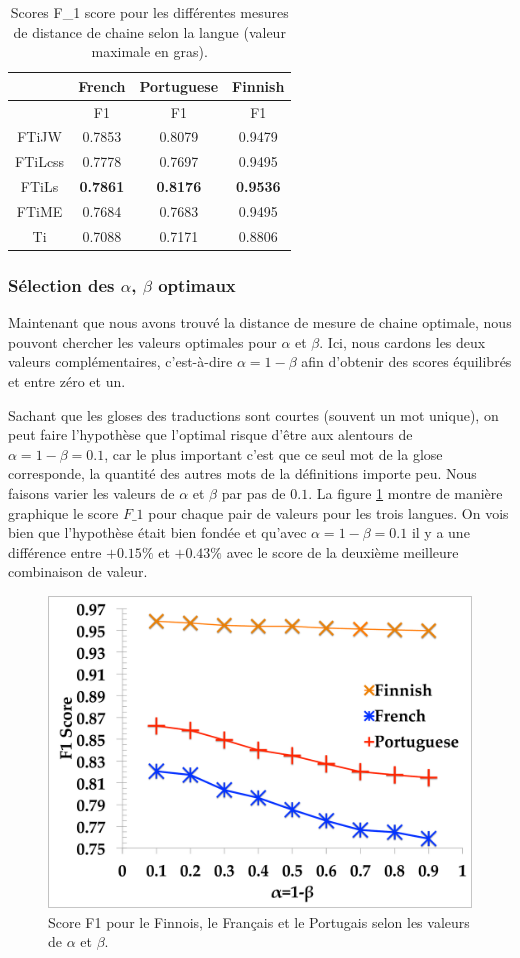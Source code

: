 \documentclass[10pt,a4paper,twoside]{article}
\begin{document}
\begin{table}
{\centering \footnotesize
\begin{tabular}{|c|c|c|c|}
\hline &French&Portuguese&Finnish\\
\hline &F1&F1&F1\\
\hline FTiJW&0.7853&0.8079&0.9479\\
\hline FTiLcss&0.7778&0.7697&0.9495\\
\hline FTiLs&\textbf{0.7861}&\textbf{0.8176}&\textbf{0.9536}\\
\hline FTiME&0.7684&0.7683&0.9495\\
\hline Ti&0.7088&0.7171&0.8806\\
\hline 
\end{tabular} 
\caption{Scores  F\_1 score pour les différentes mesures de distance de chaine selon la langue (valeur maximale en gras).}
\label{tab:expe1}
}
\end{table}

\subsubsection{Sélection des \(\alpha\), \(\beta\) optimaux}

Maintenant que nous avons trouvé la distance de mesure de chaine optimale, nous pouvont chercher les valeurs optimales pour \(\alpha\) et \(\beta\). Ici, nous cardons les deux valeurs complémentaires, c'est-à-dire \(\alpha=1-\beta\) afin d'obtenir des scores équilibrés et entre zéro et un.

Sachant que les gloses des traductions sont courtes (souvent un mot unique), on peut faire l'hypothèse que l'optimal risque d'être aux alentours de \(\alpha=1-\beta=0.1\), car le plus important c'est que ce seul mot de la glose corresponde, la quantité des autres mots de la définitions importe peu.
Nous faisons varier les valeurs de  \(\alpha\) et \(\beta\) par pas de \(0.1\). La figure \ref{fig.1} montre de manière graphique  le score \(F\_1\) pour chaque pair de valeurs pour les trois langues. On vois bien que l'hypothèse était bien fondée et qu'avec \(\alpha=1-\beta=0.1\) il y a une différence entre \(+0.15\%\) et \(+0.43\%\) avec le score de la deuxième meilleure combinaison de valeur.
	
\begin{figure}\centering
\includegraphics[width=0.30\columnwidth]{alphabetafig}
\caption{Score F1 pour le Finnois, le Français et le Portugais selon les valeurs de \(\alpha\) et \(\beta\).}
\label{fig.1}
\end{figure}
\end{document}
